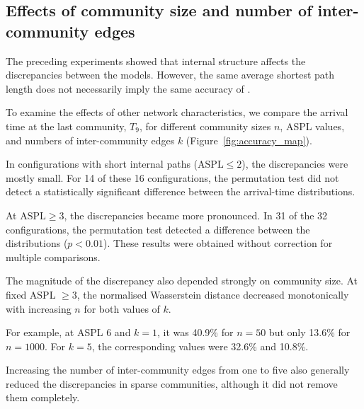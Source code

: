\subsection{Effects of community size and number of inter-community edges}
\label{sec:res_size}

The preceding experiments showed that internal structure affects the discrepancies between the models. However, the same average shortest path length does not necessarily imply the same accuracy of \TS{}.

To examine the effects of other network characteristics, we compare the arrival time at the last community, $T_9$, for different community sizes $n$, ASPL values, and numbers of inter-community edges $k$ (Figure~\ref{fig:accuracy_map}).

In configurations with short internal paths ($\mathrm{ASPL}\leq2$), the discrepancies were mostly small. For 14 of these 16 configurations, the permutation test did not detect a statistically significant difference between the arrival-time distributions.

At $\mathrm{ASPL}\geq3$, the discrepancies became more pronounced. In 31 of the 32 configurations, the permutation test detected a difference between the distributions ($p<0.01$). These results were obtained without correction for multiple comparisons.

The magnitude of the discrepancy also depended strongly on community size. At fixed ASPL $\geq3$, the normalised Wasserstein distance decreased monotonically with increasing $n$ for both values of $k$.

For example, at ASPL 6 and $k=1$, it was 40.9\% for $n=50$ but only 13.6\% for $n=1000$. For $k=5$, the corresponding values were 32.6\% and 10.8\%.

Increasing the number of inter-community edges from one to five also generally reduced the discrepancies in sparse communities, although it did not remove them completely.

